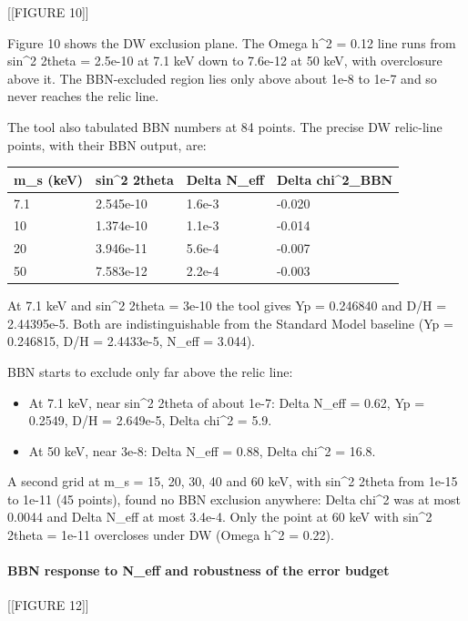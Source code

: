\documentclass[11pt,a4paper]{article}
\begin{document}
[[FIGURE 10]]

Figure 10 shows the DW exclusion plane. The Omega h\textasciicircum{}2 = 0.12 line runs from sin\textasciicircum{}2 2theta = 2.5e-10 at 7.1 keV down to 7.6e-12 at 50 keV, with overclosure above it. The BBN-excluded region lies only above about 1e-8 to 1e-7 and so never reaches the relic line.

The tool also tabulated BBN numbers at 84 points. The precise DW relic-line points, with their BBN output, are:

\begin{longtable}{@{}p{}p{}p{}p{}@{}}
\toprule
\textbf{m\_s (keV)} & \textbf{sin\textasciicircum{}2 2theta} & \textbf{Delta N\_eff} & \textbf{Delta chi\textasciicircum{}2\_BBN} \\ \midrule \endhead
7.1 & 2.545e-10 & 1.6e-3 & -0.020 \\
10 & 1.374e-10 & 1.1e-3 & -0.014 \\
20 & 3.946e-11 & 5.6e-4 & -0.007 \\
50 & 7.583e-12 & 2.2e-4 & -0.003 \\
\bottomrule\end{longtable}
At 7.1 keV and sin\textasciicircum{}2 2theta = 3e-10 the tool gives Yp = 0.246840 and D/H = 2.44395e-5. Both are indistinguishable from the Standard Model baseline (Yp = 0.246815, D/H = 2.4433e-5, N\_eff = 3.044).

BBN starts to exclude only far above the relic line:

\begin{itemize}
  \item At 7.1 keV, near sin\textasciicircum{}2 2theta of about 1e-7: Delta N\_eff = 0.62, Yp = 0.2549, D/H = 2.649e-5, Delta chi\textasciicircum{}2 = 5.9.
  \item At 50 keV, near 3e-8: Delta N\_eff = 0.88, Delta chi\textasciicircum{}2 = 16.8.
\end{itemize}
A second grid at m\_s = 15, 20, 30, 40 and 60 keV, with sin\textasciicircum{}2 2theta from 1e-15 to 1e-11 (45 points), found no BBN exclusion anywhere: \textbar{}Delta chi\textasciicircum{}2\textbar{} was at most 0.0044 and Delta N\_eff at most 3.4e-4. Only the point at 60 keV with sin\textasciicircum{}2 2theta = 1e-11 overcloses under DW (Omega h\textasciicircum{}2 = 0.22).

\paragraph{BBN response to N\_eff and robustness of the error budget}
[[FIGURE 12]]
\end{document}
